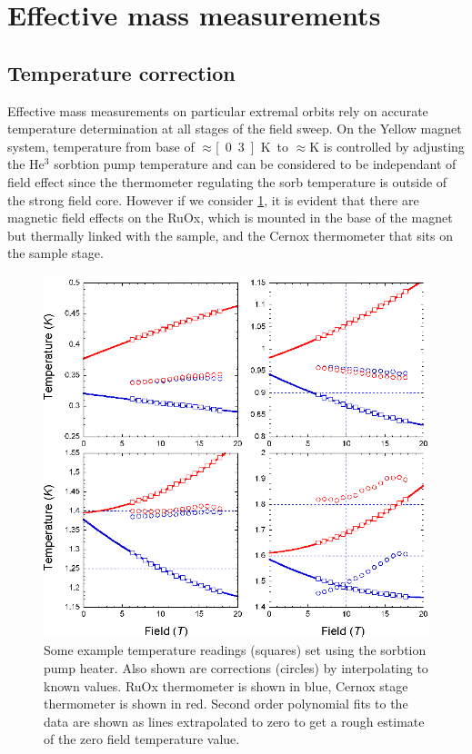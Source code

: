 
\section{Effective mass measurements}

\subsection{Temperature correction}

Effective mass measurements on particular extremal orbits rely on accurate temperature determination at all stages of the field sweep. On the Yellow magnet system, temperature from base of $\approx$\unit[0.3]{K} to $\approx$\unit[2]{K} is controlled by adjusting the He$^3$ sorbtion pump temperature and can be considered to be independant of field effect since the thermometer regulating the sorb temperature is outside of the strong field core. However if we consider \fig\ref{Fig:3:TemperatureCorrection}, it is evident that there are magnetic field effects on the RuOx, which is mounted in the base of the magnet but thermally linked with the sample, and the Cernox thermometer that sits on the sample stage.
\begin{figure}[htbp]
    \begin{center}
        \includegraphics[scale=0.9]{Chapter3-dHvABaFe2P2/Figures/Mass/TemperatureCorrection/TemperatureCorrection}
        \caption{Some example temperature readings (squares) set using the sorbtion pump heater. Also shown are corrections (circles) by interpolating to known values. RuOx thermometer is shown in blue, Cernox stage thermometer is shown in red. Second order polynomial fits to the data are shown as lines extrapolated to zero to get a rough estimate of the zero field temperature value.}
        \label{Fig:3:TemperatureCorrection}
    \end{center}
\end{figure}

